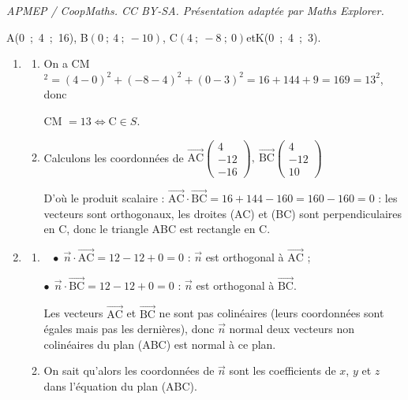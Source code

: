\documentclass[10pt]{article}
\providecommand{\vect}[1]{\overrightarrow{#1}}
\begin{document}
\noindent\textit{APMEP / CoopMaths. CC BY-SA. Présentation adaptée par Maths Explorer.}\par\medskip
\medskip


\begin{center}A(0~;~4~;~16), \quad B$(0~;~4~;~- 10)$, \quad C$(4~;~-8~;~0)$\quad et\quad  K(0~;~4~;~3).\end{center}




\medskip

\begin{enumerate}
\item 
	\begin{enumerate}
		\item 
		On a CM$^2 = (4 - 0)^2 + (- 8 - 4)^2 + (0 - 3)^2 = 16 + 144 + 9 = 169 = 13^2$, donc 
		
CM $ = 13 \iff \text{C} \in S$.
		\item 
Calculons les coordonnées de $\vect{\text{AC}}\begin{pmatrix}4\\-12\\-16\end{pmatrix}, \: \vect{\text{BC}}\begin{pmatrix}4\\-12\\10\end{pmatrix}$

D'où le produit scalaire : $\vect{\text{AC}} \cdot \vect{\text{BC}} = 16 + 144 - 160 = 160 - 160 = 0$ : les vecteurs sont orthogonaux, les droites (AC) et (BC) sont perpendiculaires en C, donc le triangle ABC est rectangle en C.
	\end{enumerate}
\item 
	\begin{enumerate}
		\item ~
$\bullet~~$$\vect{n} \cdot \vect{\text{AC}} = 12 - 12 + 0 = 0$ : $\vect{n}$ est orthogonal à $\vect{\text{AC}}$ ;

$\bullet~~$$\vect{n} \cdot \vect{\text{BC}} = 12 - 12 + 0 = 0$ : $\vect{n}$ est orthogonal à $\vect{\text{BC}}$.

Les vecteurs $\vect{\text{AC}}$ et $\vect{\text{BC}}$ ne sont pas colinéaires (leurs coordonnées sont égales mais pas les dernières), donc $\vect{n}$ normal deux vecteurs non colinéaires du plan (ABC) est normal à ce plan.
		\item 
		On sait qu'alors les coordonnées de $\vect{n}$ sont les coefficients de $x$, \: $y$ et $z$ dans l'équation du plan (ABC).
		

\end{enumerate}
\end{enumerate}
\end{document}
